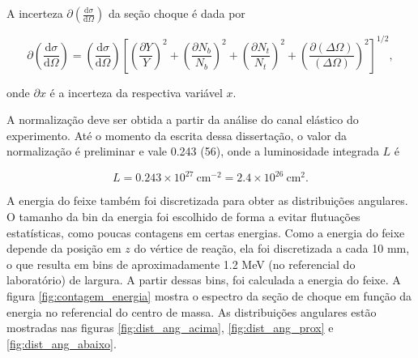 \documentclass[a4paper,12pt,oneside]{book}
\begin{document}

\par A incerteza $\partial \left(\frac{\mathrm{d}\sigma}{\mathrm{d}\Omega}\right)$ da seção choque é dada por

\begin{equation}
	\partial\left(\frac{\mathrm{d} \sigma}{\mathrm{d} \Omega}\right)=\left(\frac{\mathrm{d} \sigma}{\mathrm{d} \Omega}\right)\left[\left(\frac{\partial Y}{Y}\right)^{2}+\left(\frac{\partial N_{b}}{N_{b}}\right)^{2}+\left(\frac{\partial N_{t}}{N_{t}}\right)^{2}+\left(\frac{\partial(\Delta \Omega)}{(\Delta \Omega)}\right)^{2}\right]^{1 / 2},
\end{equation}

\par onde $\partial x$ é a incerteza da respectiva variável $x$.

\par A normalização deve ser obtida a partir da análise do canal elástico do experimento. Até o momento da escrita dessa dissertação, o valor da normalização é preliminar e vale 0.243 (56), onde a luminosidade integrada $L$ é

\begin{equation}
	L = 0.243\times 10^{27} \: \mathrm{cm}^{-2} =  2.4\times 10^{26}\: \mathrm{cm}^{2}.
\end{equation}

\par A energia do feixe também foi discretizada para obter as distribuições angulares. O tamanho da bin da energia foi escolhido de forma a evitar flutuações estatísticas, como poucas contagens em certas energias. Como a energia do feixe depende da posição em $z$ do vértice de reação, ela foi discretizada a cada 10 mm, o que resulta em bins de aproximadamente 1.2 MeV (no referencial do laboratório) de largura. A partir dessas bins, foi calculada a energia do feixe. A figura \ref{fig:contagem_energia} mostra o espectro da seção de choque em função da energia no referencial do centro de massa. As distribuições angulares estão mostradas nas figuras \ref{fig:dist_ang_acima}, \ref{fig:dist_ang_prox} e \ref{fig:dist_ang_abaixo}.
\end{document}
